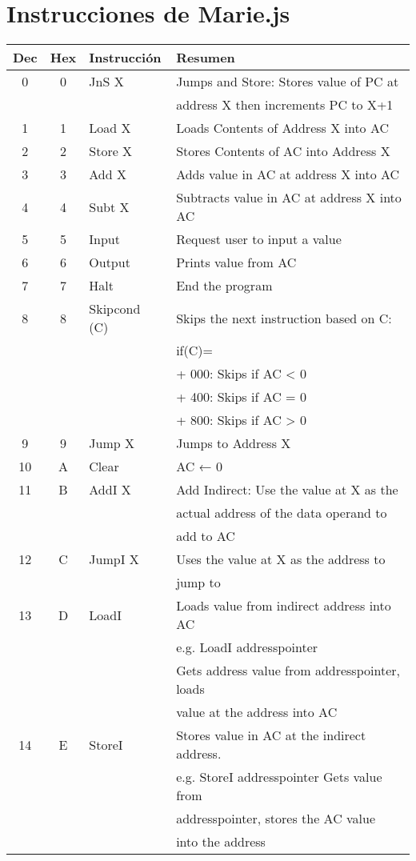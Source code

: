 \documentclass[12pt]{article}
\begin{document}
\section{Instrucciones de Marie.js}
\label{sec:org7b485e4}
\begin{center}
\begin{tabular}{|c|c|l|l|}
\hline
Dec & Hex & Instrucción & Resumen\\
\hline
0 & 0 & JnS X & Jumps and Store: Stores value of PC at\\
 &  &  & address X then increments PC to X+1\\
\hline
1 & 1 & Load X & Loads Contents of Address X into AC\\
\hline
2 & 2 & Store X & Stores Contents of AC into Address X\\
\hline
3 & 3 & Add X & Adds value in AC at address X into AC\\
\hline
4 & 4 & Subt X & Subtracts value in AC at address X into AC\\
\hline
5 & 5 & Input & Request user to input a value\\
\hline
6 & 6 & Output & Prints value from AC\\
\hline
7 & 7 & Halt & End the program\\
\hline
8 & 8 & Skipcond (C) & Skips the next instruction based on C:\\
 &  &  & if(C)=\\
 &  &  & + 000: Skips if AC < 0\\
 &  &  & + 400: Skips if AC = 0\\
 &  &  & + 800: Skips if AC > 0\\
\hline
9 & 9 & Jump X & Jumps to Address X\\
\hline
10 & A & Clear & AC ← 0\\
\hline
11 & B & AddI X & Add Indirect: Use the value at X as the\\
 &  &  & actual address of the data operand to\\
 &  &  & add to AC\\
\hline
12 & C & JumpI X & Uses the value at X as the address to\\
 &  &  & jump to\\
\hline
13 & D & LoadI & Loads value from indirect address into AC\\
 &  &  & e.g. LoadI addresspointer\\
 &  &  & Gets address value from addresspointer, loads\\
 &  &  & value at the address into AC\\
\hline
14 & E & StoreI & Stores value in AC at the indirect address.\\
 &  &  & e.g. StoreI addresspointer Gets value from\\
 &  &  & addresspointer, stores the AC value\\
 &  &  & into the address\\
\hline
\end{tabular}
\end{center}
\pagebreak
\end{document}
